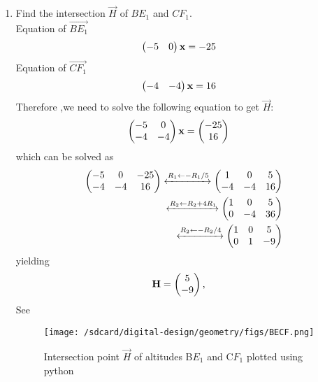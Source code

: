 \documentclass[11pt]{book}
\begin{document}
\begin{enumerate}[label=\thesection.\arabic*.,ref=\thesection.\theenumi]
\item Find the intersection $\vec{H}$ of $BE_1$ and $CF_1$.
 \\  \solution Equation of $\vec{BE_1}$ \\
\begin{align}
    \begin{pmatrix}-5 & 0\end{pmatrix}\mathbf{x}&= -25
\end{align}
Equation of $\vec{CF_1}$ \\
\begin{align}
    \begin{pmatrix}-4 & -4\end{pmatrix}\mathbf{x}&=16
\end{align}
Therefore ,we need to solve the following equation to get $\vec{H}:$ \\
\begin{align}
        \begin{pmatrix}-5&0\\-4&-4\end{pmatrix} \mathbf{x} &= \begin{pmatrix}-25\\16\end{pmatrix}
\end{align}
%
which can be solved as 
%
\begin{align}
        \begin{pmatrix}-5&0&-25\\-4&-4&16\end{pmatrix}
	 \xleftrightarrow[]{R_1 \leftarrow  -R_1/5}
        \begin{pmatrix}1&0&5\\-4&-4&16\end{pmatrix}\\
	 \xleftrightarrow[]{R_2 \leftarrow R_2+4R_1}
        \begin{pmatrix}1&0&5\\0&-4&36\end{pmatrix} \\
	 \xleftrightarrow[]{R_2 \leftarrow -R_2/4}
        \begin{pmatrix}1&0&5\\0&1&-9\end{pmatrix}
\end{align}
%
yielding
%
\begin{align}
        \vec{H}&=\myvec{{5}\\{-9}}
		\label{eq:geo-alt-H},
\end{align}
%
See 
\begin{figure}[H]
\centering
\texttt{[image: /sdcard/digital-design/geometry/figs/BECF.png]}
\caption{Intersection point $\vec{H}$ of altitudes B$E_{1}$ and C$F_{1}$ plotted using python}
\label{fig:m_tri_py}
\end{figure}


\end{enumerate}
\end{document}
